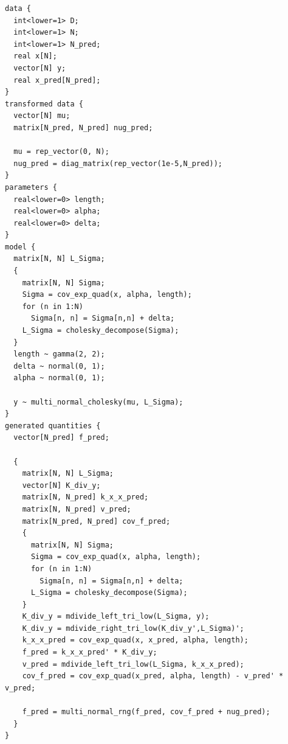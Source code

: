 \documentclass{article}
\begin{document}
\begin{verbatim}
data {
  int<lower=1> D;
  int<lower=1> N;
  int<lower=1> N_pred;
  real x[N];
  vector[N] y;
  real x_pred[N_pred];
}
transformed data {
  vector[N] mu;
  matrix[N_pred, N_pred] nug_pred;

  mu = rep_vector(0, N);
  nug_pred = diag_matrix(rep_vector(1e-5,N_pred));
}
parameters {
  real<lower=0> length;
  real<lower=0> alpha;
  real<lower=0> delta;
}
model {
  matrix[N, N] L_Sigma;
  {
    matrix[N, N] Sigma;
    Sigma = cov_exp_quad(x, alpha, length);
    for (n in 1:N)
      Sigma[n, n] = Sigma[n,n] + delta;
    L_Sigma = cholesky_decompose(Sigma);
  }
  length ~ gamma(2, 2);
  delta ~ normal(0, 1);
  alpha ~ normal(0, 1);

  y ~ multi_normal_cholesky(mu, L_Sigma);
}
generated quantities {
  vector[N_pred] f_pred;

  {
    matrix[N, N] L_Sigma;
    vector[N] K_div_y;
    matrix[N, N_pred] k_x_x_pred;
    matrix[N, N_pred] v_pred;
    matrix[N_pred, N_pred] cov_f_pred;
    {
      matrix[N, N] Sigma;
      Sigma = cov_exp_quad(x, alpha, length);
      for (n in 1:N)
        Sigma[n, n] = Sigma[n,n] + delta;
      L_Sigma = cholesky_decompose(Sigma);
    }
    K_div_y = mdivide_left_tri_low(L_Sigma, y);
    K_div_y = mdivide_right_tri_low(K_div_y',L_Sigma)';
    k_x_x_pred = cov_exp_quad(x, x_pred, alpha, length);
    f_pred = k_x_x_pred' * K_div_y; 
    v_pred = mdivide_left_tri_low(L_Sigma, k_x_x_pred);
    cov_f_pred = cov_exp_quad(x_pred, alpha, length) - v_pred' * v_pred;

    f_pred = multi_normal_rng(f_pred, cov_f_pred + nug_pred);
  }
}
\end{verbatim}




\end{document}
